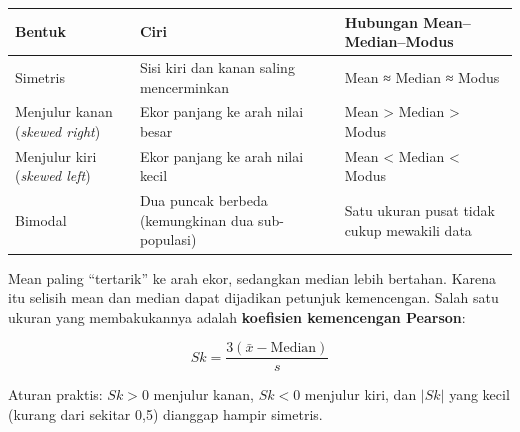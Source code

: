 \documentclass[
  indonesian,
  letterpaper,
]{book}
\newcounter{none} %
\begin{document}
{\def\LTcaptype{none} %
\begin{longtable}[]{@{}
  >{\raggedright\arraybackslash}p{}
  >{\raggedright\arraybackslash}p{}
  >{\raggedright\arraybackslash}p{}@{}}
\toprule\noalign{}
\begin{minipage}[b]{\linewidth}\raggedright
Bentuk
\end{minipage} & \begin{minipage}[b]{\linewidth}\raggedright
Ciri
\end{minipage} & \begin{minipage}[b]{\linewidth}\raggedright
Hubungan Mean--Median--Modus
\end{minipage} \\
\midrule\noalign{}
\endhead
\bottomrule\noalign{}
\endlastfoot
Simetris & Sisi kiri dan kanan saling mencerminkan & Mean ≈ Median ≈
Modus \\
Menjulur kanan (\emph{skewed right}) & Ekor panjang ke arah nilai besar
& Mean \textgreater{} Median \textgreater{} Modus \\
Menjulur kiri (\emph{skewed left}) & Ekor panjang ke arah nilai kecil &
Mean \textless{} Median \textless{} Modus \\
Bimodal & Dua puncak berbeda (kemungkinan dua sub-populasi) & Satu
ukuran pusat tidak cukup mewakili data \\
\end{longtable}
}

Mean paling ``tertarik'' ke arah ekor, sedangkan median lebih bertahan.
Karena itu selisih mean dan median dapat dijadikan petunjuk kemencengan.
Salah satu ukuran yang membakukannya adalah \textbf{koefisien
kemencengan Pearson}:

\[Sk = \frac{3(\bar{x} - \text{Median})}{s}\]

Aturan praktis: \(Sk > 0\) menjulur kanan, \(Sk < 0\) menjulur kiri, dan
\(|Sk|\) yang kecil (kurang dari sekitar 0,5) dianggap hampir simetris.
\end{document}
